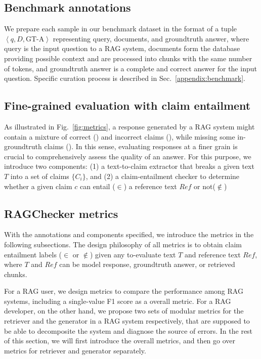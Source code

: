 \subsection{Benchmark annotations}

We prepare each sample in our benchmark dataset in the format of a tuple $\left< q, D, \text{GT-A}\right>$ representing query, documents, and groundtruth answer, where query is the input question to a RAG system, documents form the database providing possible context and are processed into chunks with the same number of tokens, and groundtruth answer is a complete and correct answer for the input question. Specific curation process is described in Sec.~\ref{appendix:benchmark}.

\subsection{Fine-grained evaluation with claim entailment}

As illustrated in Fig.~\ref{fig:metrics}, a response generated by a RAG system might contain a mixture of correct (\hollowcircle) and incorrect claims (\crossmark), while missing some in-groundtruth claims (\hollowtriangle). In this sense, evaluating responses at a finer grain is crucial to comprehensively assess the quality of an answer. For this purpose, we introduce two components: (1) a text-to-claim extractor that breaks a given text $T$ into a set of claims $\{C_i\}$, and (2) a claim-entailment checker to determine whether a given claim $c$ can entail ($\in$) a reference text $Ref$ or not($\notin$)

\subsection{RAGChecker metrics}

With the annotations and components specified, we introduce the metrics in the following subsections. The design philosophy of all metrics is to obtain claim entailment labels ($\in$ or $\notin$) given any to-evaluate text $T$ and reference text $Ref$, where $T$ and $Ref$ can be model response, groundtruth answer, or retrieved chunks.

For a RAG user, we design metrics to compare the performance among RAG systems, including a single-value F1 score as a overall metric. For a RAG developer, on the other hand, we propose two sets of modular metrics for the retriever and the generator in a RAG system respectively, that are supposed to be able to decomposite the system and diagnose the source of errors. In the rest of this section, we will first introduce the overall metrics, and then go over metrics for retriever and generator separately.


